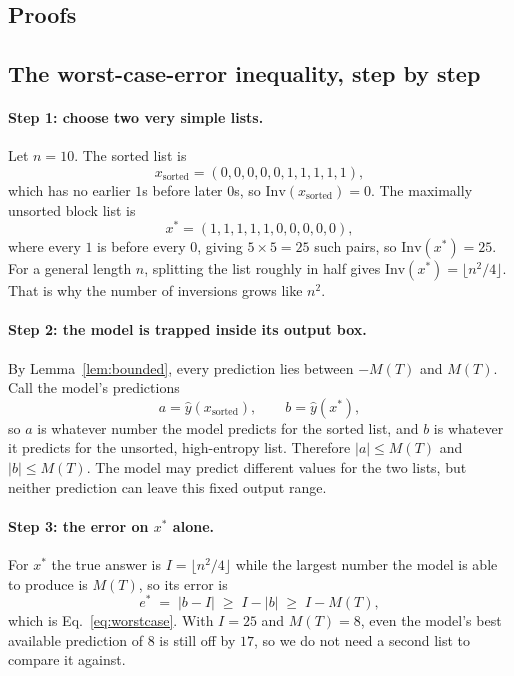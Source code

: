 \documentclass[10pt]{article}
\theoremstyle{definition}
\newcommand{\Inv}{\mathrm{Inv}}
\begin{document}
\clearpage
\begin{appendices}

\section{Proofs}
\label{app:proofs}

\subsection{The worst-case-error inequality, step by step}
\label{app:worstcase-deriv}

\paragraph{Step 1: choose two very simple lists.}
Let $n = 10$. The sorted list is
\[
x_{\text{sorted}} = (0,0,0,0,0,1,1,1,1,1),
\]
which has no earlier $1$s before later $0$s, so
$\Inv(x_{\text{sorted}}) = 0$. The maximally unsorted block list is
\[
x^{*} = (1,1,1,1,1,0,0,0,0,0),
\]
where every $1$ is before every $0$, giving $5 \times 5 = 25$ such pairs,
so $\Inv(x^{*}) = 25$. For a general length $n$, splitting the list
roughly in half gives $\Inv(x^{*}) = \lfloor n^2/4 \rfloor$. That is why
the number of inversions grows like $n^2$.

\paragraph{Step 2: the model is trapped inside its output box.}
By Lemma~\ref{lem:bounded}, every prediction lies between $-M(T)$ and
$M(T)$. Call the model's predictions
\[
a = \hat{y}(x_{\text{sorted}}), \qquad b = \hat{y}(x^{*}),
\]
so $a$ is whatever number the model predicts for the sorted list, and $b$
is whatever it predicts for the unsorted, high-entropy list. Therefore
$|a| \leq M(T)$ and $|b| \leq M(T)$. The model may predict different
values for the two lists, but neither prediction can leave this fixed
output range.

\paragraph{Step 3: the error on $x^{*}$ alone.}
For $x^{*}$ the true answer is $I = \lfloor n^2/4 \rfloor$ while the largest
number the model is able to produce is $M(T)$, so its error is
\[
e^{*} \;=\; |b - I| \;\geq\; I - |b| \;\geq\; I - M(T),
\]
which is Eq.~\eqref{eq:worstcase}. With $I = 25$ and $M(T) = 8$, even the
model's best available prediction of $8$ is still off by $17$, so we do not
need a second list to compare it against.


\end{appendices}
\end{document}
